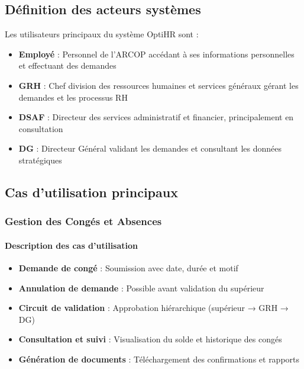 \subsection{Définition des acteurs systèmes}
Les utilisateurs principaux du système OptiHR sont :
\begin{itemize}
    \item \textbf{Employé} : Personnel de l'ARCOP accédant à ses informations personnelles et effectuant des demandes
    \item \textbf{GRH} : Chef division des ressources humaines et services généraux gérant les demandes et les processus RH
    \item \textbf{DSAF} : Directeur des services administratif et financier, principalement en consultation
    \item \textbf{DG} : Directeur Général validant les demandes et consultant les données stratégiques
\end{itemize}

\subsection{Cas d'utilisation principaux}
\subsubsection{Gestion des Congés et Absences}
\paragraph{Description des cas d'utilisation}
\begin{itemize}
    \item \textbf{Demande de congé} : Soumission avec date, durée et motif
    \item \textbf{Annulation de demande} : Possible avant validation du supérieur
    \item \textbf{Circuit de validation} : Approbation hiérarchique (supérieur → GRH → DG)
    \item \textbf{Consultation et suivi} : Visualisation du solde et historique des congés
    \item \textbf{Génération de documents} : Téléchargement des confirmations et rapports
\end{itemize}

